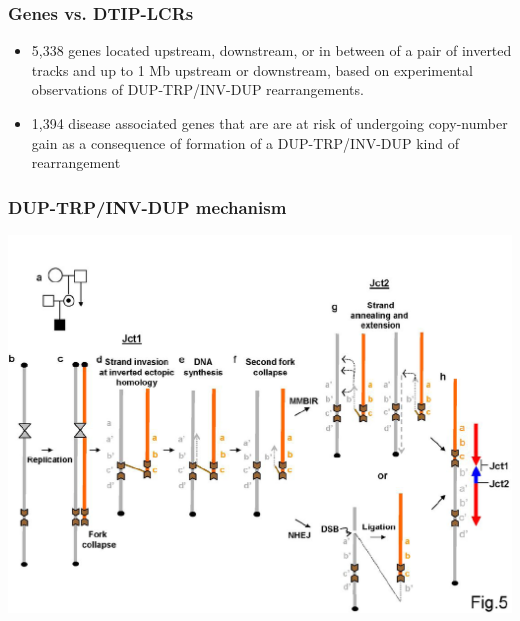\begin{frame}\frametitle{Genes vs. DTIP-LCRs} 
\begin{itemize}
 \item 5,338 genes located upstream, downstream, or in between of a pair of inverted tracks and up
to 1 Mb upstream or downstream, based on experimental observations of DUP-TRP/INV-DUP rearrangements. 
 \item  1,394 disease associated genes that are are at risk of undergoing copy-number gain as a consequence of formation of a DUP-TRP/INV-DUP kind of rearrangement 
\end{itemize}
\end{frame}


\begin{frame}\frametitle{DUP-TRP/INV-DUP mechanism}  
	   \includegraphics[width=1 \textwidth]{new-images/DTIP.png}\\
\end{frame}

